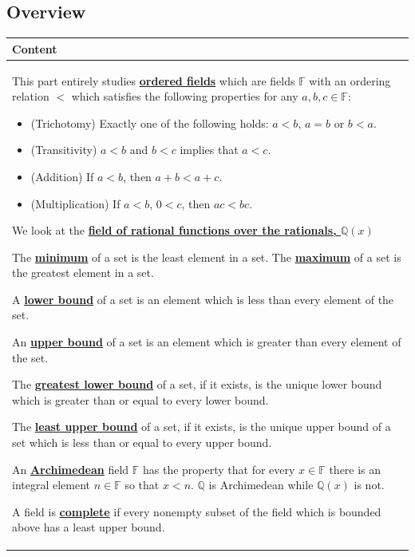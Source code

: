 \documentclass[11pt]{article}
\renewcommand\emph[1]{\underline{\bf{#1}}} %
\theoremstyle{definition}
\begin{document}
\subsection{Overview}
 
 \vspace*{-16pt}
\begin{tabular}{L{6.5in}} 
{\bf Content} \\ \hline \parskip4pt

  This part entirely studies \emph{ordered fields} which are fields $\mathbb{F}$ with 
  an ordering relation $<$ which satisfies the following properties for any $a,b,c\in\mathbb{F}$:
\begin{itemize}
  \item (Trichotomy) Exactly one of the following holds: $a < b$, $a=b$ or $b < a$.
  \item (Transitivity) $a< b$ and $b < c$ implies that $a < c$.
  \item (Addition) If $a< b$, then $a+b < a+c$.
  \item (Multiplication) If $a < b$, $0 < c$, then $ac < bc$.
\end{itemize}

 We look at the \emph{field of rational functions over the rationals, $\mathbb{Q}(x)$}

 The \emph{minimum} of a set is the least element in a set. The \emph{maximum} of
 a set is the greatest element in a set.

 A \emph{lower bound} of a set is an element which is less than every element of the
 set. 
 
 An \emph{upper bound} of a set is an element which is greater than 
 every element of the set.

 The \emph{greatest lower bound} of a set, if it exists, is the unique lower bound which is greater
 than or equal to every lower bound.

 The \emph{least upper bound} of a set, if it exists, is the unique upper bound of a set
 which is less than or equal to every upper bound.

 An \emph{Archimedean} field $\mathbb{F}$ has the property that for every 
 $x\in\mathbb{F}$ there is an integral element $n\in\mathbb{F}$ so that
 $x < n$. $\mathbb{Q}$ is Archimedean while $\mathbb{Q}(x)$ is not.

 A field is \emph{complete} if every nonempty subset of the field which is 
 bounded above has a least upper bound.

\end{tabular}
\end{document}
